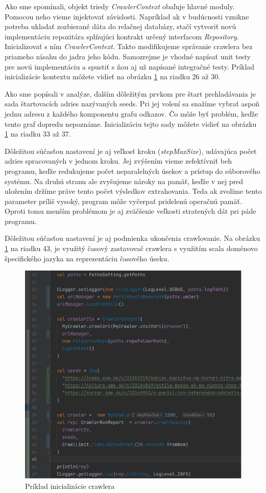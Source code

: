 Ako sme spomínali, objekt triedy \textit{CrawlerContext} obaľuje hlavné moduly. Pomocou neho vieme injektovať závislosti. Napríklad ak v budúcnosti vznikne potreba ukladať zozbierané dáta do relačnej databázy, stačí vytvoriť novú implementáciu repozitára splňujúci kontrakt určený interfacom \textit{Repository}. Inicializovať s ním \textit{CrawlerContext}. Takto modifikujeme správanie crawlera bez priameho zásahu do jadra jeho kódu. Samozrejme je vhodné napísať unit testy pre novú implementáciu a spustiť s ňou aj už napísané integračné testy. Príklad inicializácie kontextu môžete vidieť na obrázku \ref{o:initCrawl} na riadku 26 až 30.

Ako sme popísali v analýze, ďalším dôležitým prvkom pre štart prehladávania je sada štartovacích adries nazývaných seeds. Pri jej volení sa snažíme vybrať aspoň jednu adresu z každého komponentu grafu odkazov. Čo môže byť problém, keďže tento graf dopredu nepoznáme. Inicializáciu tejto sady môžete vidieť na obrázku \ref{o:initCrawl} na riadku 33 až 37.

Dôležitou súčasťou nastavení je aj veľkosť kroku (\textit{stepMaxSize}), udávajúca počet adries spracovaných v jednom kroku. Jej zvýšením vieme zefektívniť beh programu, keďže redukujeme počet neparalelných úsekov a prístup do súborového systému. Na druhú stranu ale zvyšujeme nároky na pamäť, keďže v nej pred uložením držíme práve tento počet výsledkov extrahovania. Teda ak zvolíme tento parameter príliš vysoký, program môže vyčerpať pridelenú operačnú pamäť. Oproti tomu menším problémom je aj zväčšenie veľkosti stratených dát pri páde programu. 

Dôležitou súčasťou nastavení je aj podmienka ukončenia crawlovanie. Na obrázku \ref{o:initCrawl} na riadku 43, je využitý časový zastavovač crawlera s využitím scala doménovo špecifického jazyka na reprezentáciu časového úseku. 


\begin{figure}[!ht]
    \centering
    \includegraphics[width=.9\textwidth]{figures/crawlInit.png}
    \caption{Príklad inicializácie crawlera}
    \label{o:initCrawl}
\end{figure}

